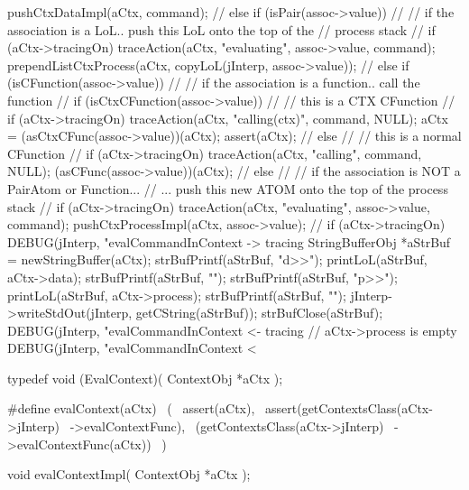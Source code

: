 {{{{        pushCtxDataImpl(aCtx, command);
        //
      } else if (isPair(assoc->value)) {
        //
        // if the association is a LoL.. push this LoL onto the top of the
        // process stack
        //
        if (aCtx->tracingOn)
          traceAction(aCtx, "evaluating", assoc->value, command);
        prependListCtxProcess(aCtx,
          copyLoL(jInterp, assoc->value));
        //
      } else if (isCFunction(assoc->value)) {
        //
        // if the association is a function.. call the function
        //
        if (isCtxCFunction(assoc->value)) {
          //
          // this is a CTX CFunction
          //
          if (aCtx->tracingOn) 
            traceAction(aCtx, "calling(ctx)", command, NULL);
          aCtx = (asCtxCFunc(assoc->value))(aCtx);
          assert(aCtx);
          //
        } else {
          //
          // this is a normal CFunction
          //
          if (aCtx->tracingOn)
            traceAction(aCtx, "calling", command, NULL);
          (asCFunc(assoc->value))(aCtx);
          //
        }
      } else {
        //
        // if the association is NOT a PairAtom or Function...
        // ... push this new ATOM onto the top of the process stack
        //
        if (aCtx->tracingOn)
          traceAction(aCtx, "evaluating", assoc->value, command);
        pushCtxProcessImpl(aCtx, assoc->value);
        //
      }
    }
    if (aCtx->tracingOn) {
      DEBUG(jInterp, "evalCommandInContext -> tracing%
      StringBufferObj *aStrBuf = newStringBuffer(aCtx);
      strBufPrintf(aStrBuf, "d>>");
      printLoL(aStrBuf, aCtx->data);
      strBufPrintf(aStrBuf, "\n");
      strBufPrintf(aStrBuf, "p>>");
      printLoL(aStrBuf, aCtx->process);
      strBufPrintf(aStrBuf, "\n");
      jInterp->writeStdOut(jInterp, getCString(aStrBuf));
      strBufClose(aStrBuf);
      DEBUG(jInterp, "evalCommandInContext <- tracing%
    }
  } // aCtx->process is empty
  DEBUG(jInterp, "evalCommandInContext < %
}
\stopCCode

\startCHeader
typedef void (EvalContext)(
  ContextObj *aCtx
);

#define evalContext(aCtx)                   \
  (                                         \
    assert(aCtx),                           \
    assert(getContextsClass(aCtx->jInterp)  \
      ->evalContextFunc),                   \
    (getContextsClass(aCtx->jInterp)        \
      ->evalContextFunc(aCtx))              \
  )
\stopCHeader

\setCHeaderStream{private}
\startCHeader
void evalContextImpl(
  ContextObj *aCtx
);
\stopCHeader
{}

